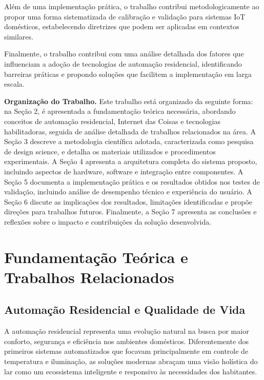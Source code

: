 \documentclass[twoside,english,brazilian]{UNISINOSmonografia}
\begin{document}
Além de uma implementação prática, o trabalho contribui metodologicamente ao propor uma forma sistematizada de calibração e validação para sistemas IoT domésticos, estabelecendo diretrizes que podem ser aplicadas em contextos similares. 

Finalmente, o trabalho contribui com uma análise detalhada dos fatores que influenciam a adoção de tecnologias de automação residencial, identificando barreiras práticas e propondo soluções que facilitem a implementação em larga escala.

\noindent\textbf{Organização do Trabalho.} Este trabalho está organizado da seguinte forma: na Seção 2, é apresentada a fundamentação teórica necessária, abordando conceitos de automação residencial, Internet das Coisas e tecnologias habilitadoras, seguida de análise detalhada de trabalhos relacionados na área. A Seção 3 descreve a metodologia científica adotada, caracterizada como pesquisa de design science, e detalha os materiais utilizados e procedimentos experimentais. A Seção 4 apresenta a arquitetura completa do sistema proposto, incluindo aspectos de hardware, software e integração entre componentes. A Seção 5 documenta a implementação prática e os resultados obtidos nos testes de validação, incluindo análise de desempenho técnico e experiência do usuário. A Seção 6 discute as implicações dos resultados, limitações identificadas e propõe direções para trabalhos futuros. Finalmente, a Seção 7 apresenta as conclusões e reflexões sobre o impacto e contribuições da solução desenvolvida.

\chapter{Fundamentação Teórica e Trabalhos Relacionados}

\section{Automação Residencial e Qualidade de Vida}

A automação residencial representa uma evolução natural na busca por maior conforto, segurança e eficiência nos ambientes domésticos. Diferentemente dos primeiros sistemas automatizados que focavam principalmente em controle de temperatura e iluminação, as soluções modernas abraçam uma visão holística do lar como um ecossistema inteligente e responsivo às necessidades dos habitantes.
\end{document}
